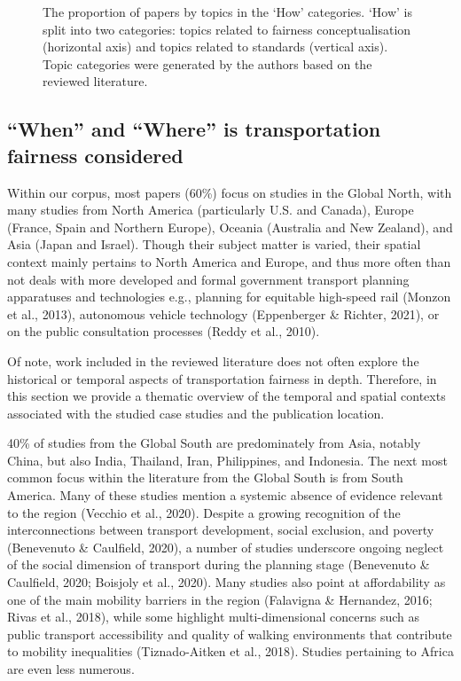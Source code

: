 \documentclass[
  letterpaper,
  DIV=11,
  numbers=noendperiod]{scrartcl}
\begin{document}
\begin{figure}


\caption{\label{fig-fig2}The proportion of papers by topics in the `How'
categories. `How' is split into two categories: topics related to
fairness conceptualisation (horizontal axis) and topics related to
standards (vertical axis). Topic categories were generated by the
authors based on the reviewed literature.}

\end{figure}%

\subsection{``When'' and ``Where'' is transportation fairness
considered}\label{when-and-where-is-transportation-fairness-considered}

Within our corpus, most papers (60\%) focus on studies in the Global
North, with many studies from North America (particularly U.S. and
Canada), Europe (France, Spain and Northern Europe), Oceania (Australia
and New Zealand), and Asia (Japan and Israel). Though their subject
matter is varied, their spatial context mainly pertains to North America
and Europe, and thus more often than not deals with more developed and
formal government transport planning apparatuses and technologies e.g.,
planning for equitable high-speed rail (Monzon et al., 2013), autonomous
vehicle technology (Eppenberger \& Richter, 2021), or on the public
consultation processes (Reddy et al., 2010).

Of note, work included in the reviewed literature does not often explore
the historical or temporal aspects of transportation fairness in depth.
Therefore, in this section we provide a thematic overview of the
temporal and spatial contexts associated with the studied case studies
and the publication location.

40\% of studies from the Global South are predominately from Asia,
notably China, but also India, Thailand, Iran, Philippines, and
Indonesia. The next most common focus within the literature from the
Global South is from South America. Many of these studies mention a
systemic absence of evidence relevant to the region (Vecchio et al.,
2020). Despite a growing recognition of the interconnections between
transport development, social exclusion, and poverty (Benevenuto \&
Caulfield, 2020), a number of studies underscore ongoing neglect of the
social dimension of transport during the planning stage (Benevenuto \&
Caulfield, 2020; Boisjoly et al., 2020). Many studies also point at
affordability as one of the main mobility barriers in the region
(Falavigna \& Hernandez, 2016; Rivas et al., 2018), while some highlight
multi-dimensional concerns such as public transport accessibility and
quality of walking environments that contribute to mobility inequalities
(Tiznado-Aitken et al., 2018). Studies pertaining to Africa are even
less numerous.
\end{document}
